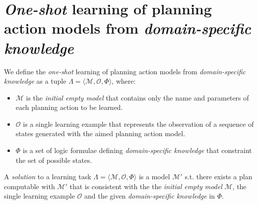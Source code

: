 \documentclass{article}
\newcommand{\tup}[1]{{\langle #1 \rangle}}
\newcommand{\strips}{\textsc{Strips}}
\begin{document}



\section{{\em One-shot} learning of planning action models from {\em domain-specific knowledge}}
\label{sec:learning}
We define the {\em one-shot} learning of planning action models from {\em domain-specific knowledge} as a tuple $\Lambda=\tup{\mathcal{M},{\mathcal O},\Phi}$, where:
\begin{itemize}
\item $\mathcal{M}$ is the {\em initial empty model} that contains only the name and parameters of each planning action to be learned.
\item $\mathcal{O}$ is a single learning example that represents the observation of a sequence of states generated with the aimed planning action model. 
\item $\Phi$ is a set of logic formulae defining {\em domain-specific knowledge} that constraint the set of possible states.
\end{itemize}

A {\em solution} to a learning task $\Lambda=\tup{\mathcal{M},{\mathcal O},\Phi}$ is a model $\mathcal{M}'$ s.t. there exists a plan computable with $\mathcal{M}'$ that is consistent with the the {\em initial empty model} $\mathcal{M}$, the single learning example $\mathcal{O}$ and the given {\em domain-specific knowledge} in $\Phi$.
\end{document}
